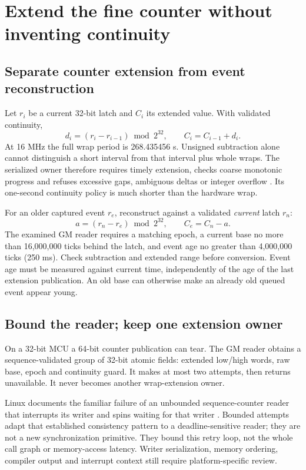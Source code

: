 \documentclass[10pt,letterpaper]{article}
\begin{document}
\newpage
\section{Extend the fine counter without inventing continuity}
\subsection{Separate counter extension from event reconstruction}
Let $r_i$ be a current 32-bit latch and $C_i$ its extended value. With validated continuity,
\[
 d_i=(r_i-r_{i-1})\bmod 2^{32},\qquad C_i=C_{i-1}+d_i .
\]
At 16 MHz the full wrap period is 268.435456 s. Unsigned subtraction alone cannot distinguish a short interval from that interval plus whole wraps. The serialized owner therefore requires timely extension, checks coarse monotonic progress and refuses excessive gaps, ambiguous deltas or integer overflow \cite{implementation}. Its one-second continuity policy is much shorter than the hardware wrap.

For an older captured event $r_e$, reconstruct against a validated \emph{current} latch $r_n$:
\[
 a=(r_n-r_e)\bmod 2^{32},\qquad C_e=C_n-a .
\]
The examined GM reader requires a matching epoch, a current base no more than 16,000,000 ticks behind the latch, and event age no greater than 4,000,000 ticks (250 ms). Check subtraction and extended range before conversion. Event age must be measured against current time, independently of the age of the last extension publication. An old base can otherwise make an already old queued event appear young.

\subsection{Bound the reader; keep one extension owner}
On a 32-bit MCU a 64-bit counter publication can tear. The GM reader obtains a sequence-validated group of 32-bit atomic fields: extended low/high words, raw base, epoch and continuity guard. It makes at most two attempts, then returns unavailable. It never becomes another wrap-extension owner.

Linux documents the familiar failure of an unbounded sequence-counter reader that interrupts its writer and spins waiting for that writer \cite{seq}. Bounded attempts adapt that established consistency pattern to a deadline-sensitive reader; they are not a new synchronization primitive. They bound this retry loop, not the whole call graph or memory-access latency. Writer serialization, memory ordering, compiler output and interrupt context still require platform-specific review.
\end{document}
